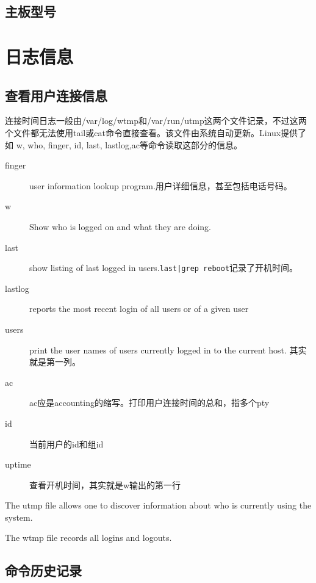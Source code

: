 \subsection*{主板型号}













\section{日志信息}


\subsection{查看用户连接信息}
连接时间日志一般由/var/log/wtmp和/var/run/utmp这两个文件记录，不过这两个文件都无法使用tail或cat命令直接查看。该文件由系统自动更新。Linux提供了如 w, who, finger, id, last, lastlog,ac等命令读取这部分的信息。
\begin{description}
    \item[finger]user information lookup program.用户详细信息，甚至包括电话号码。 
    \item[w]Show who is logged on and what they are doing.
    \item[last]show listing of last logged in users.\verb+last|grep reboot+记录了开机时间。 
    \item[lastlog] reports the most recent login of all users or of a given user
    \item[users]print the user names of users currently logged in to the current host. 其实就是第一列。
    \item[ac]ac应是accounting的缩写。打印用户连接时间的总和，指多个pty
    \item[id]当前用户的id和组id
    \item[uptime]查看开机时间，其实就是w输出的第一行
\end{description}

The utmp file allows one to discover information about who is currently using the system. 

The  wtmp  file records all logins and logouts.

\subsection{命令历史记录}


